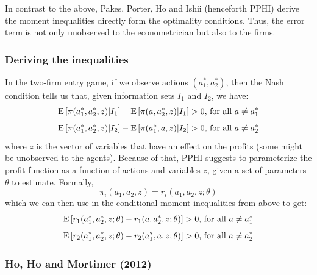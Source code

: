 In contrast to the above, Pakes, Porter, Ho and Ishii (henceforth PPHI) derive the moment inequalities directly form the optimality conditions. Thus, the error term is not only unobserved to the econometrician but also to the firms.

\subsubsection{Deriving the inequalities}

In the two-firm entry game, if we observe actions $(a_1^*, a_2^*)$, then the Nash condition tells us that, given information sets $I_1$ and $I_2$, we have: $$ \operatorname{E}\left[ \pi(a_1^*, a_2^*, z) | I_1 \right] -  \operatorname{E}\left[ \pi(a, a_2^*, z) | I_1 \right] > 0 \text{, for all } a\neq a_1^* $$ $$ \operatorname{E}\left[ \pi(a_1^*, a_2^*, z) | I_2 \right] -  \operatorname{E}\left[ \pi(a_1^*, a, z) | I_2 \right] > 0 \text{, for all } a\neq a_2^* $$ where $z$ is the vector of variables that have an effect on the profits (some might be unobserved to the agents). Because of that, PPHI suggests to parameterize the profit function as a function of actions and variables $z$, given a set of parameters $\theta$ to estimate. Formally, $$\pi_i(a_1, a_2, z) = r_i(a_1, a_2, z;\theta) $$ which we can then use in the conditional moment inequalities from above to get: $$ \operatorname{E}\left[ r_1(a_1^*, a_2^*, z; \theta) - r_1(a, a_2^*, z; \theta) \right] > 0 \text{, for all } a\neq a_1^* $$ $$ \operatorname{E}\left[ r_2(a_1^*, a_2^*, z;\theta ) - r_2(a_1^*, a, z; \theta) \right] > 0 \text{, for all } a\neq a_2^* $$

\subsubsection{Ho, Ho and Mortimer (2012)}

